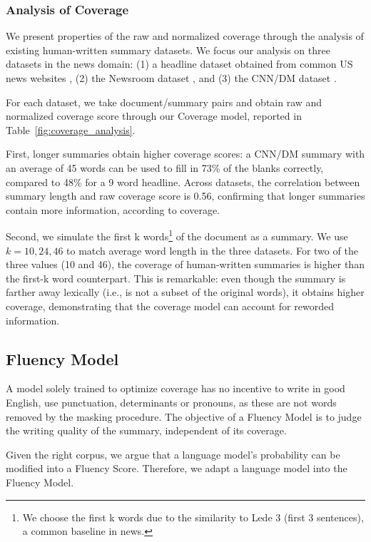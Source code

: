 \documentclass[11pt,a4paper]{article}
\begin{document}
\subsubsection{Analysis of Coverage}
We present properties of the raw and normalized coverage through the analysis of existing human-written summary datasets. We focus our analysis on three datasets in the news domain: (1) a headline dataset obtained from common US news websites \cite{laban2017newslens}, (2) the Newsroom dataset  \cite{grusky2018newsroom}, and (3) the CNN/DM dataset \cite{nallapati2016abstractive}.

For each dataset, we take document/summary pairs and obtain raw and normalized coverage score through our Coverage model, reported in Table~\ref{fig:coverage_analysis}.

First, longer summaries obtain higher coverage scores: a CNN/DM summary with an average of 45 words can be used to fill in 73\% of the blanks correctly, compared to 48\% for a 9 word headline. Across datasets, the correlation between summary length and raw coverage score is 0.56, confirming that longer summaries contain more information, according to coverage.

Second, we simulate the first k words\footnote{We choose the first k words due to the similarity to Lede 3 (first 3 sentences), a common baseline in news.} of the document as a summary. We use $k = 10, 24, 46$ to match average word length in the three datasets. For two of the three values (10 and 46), the coverage of human-written summaries is higher than the first-k word counterpart. This is remarkable: even though the summary is farther away lexically (i.e., is not a subset of the original words), it obtains higher coverage, demonstrating that the coverage model can account for reworded information.

\subsection{Fluency Model}
\label{section:fluencymodel}

A model solely trained to optimize coverage has no incentive to write in good English, use punctuation, determinants or pronouns, as these are not words removed by the masking procedure. The objective of a Fluency Model is to judge  the writing quality of the summary, independent of its coverage.

Given the right corpus, we argue that a language model's probability can be modified into a Fluency Score. Therefore, we adapt a language model into the Fluency Model.
\end{document}
